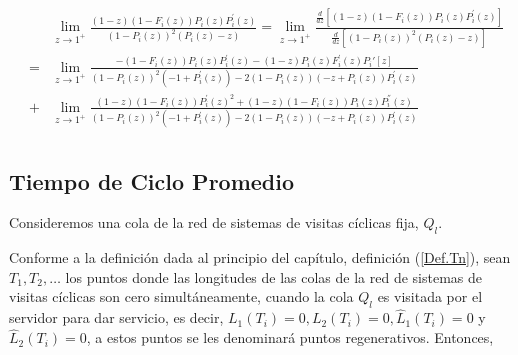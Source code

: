 \documentclass{article}
\begin{document}
\begin{eqnarray*}
&&\lim_{z\rightarrow1^{+}}\frac{\left(1-z\right)\left(1-F_{i}\left(z\right)\right)P_{i}\left(z\right)P_{i}^{'}\left(z\right)}{\left(1-P_{i}\left(z\right)\right)^{2}\left(P_{i}\left(z\right)-z\right)}=\lim_{z\rightarrow1^{+}}\frac{\frac{d}{dz}\left[\left(1-z\right)\left(1-F_{i}\left(z\right)\right)P_{i}\left(z\right)P_{i}^{'}\left(z\right)\right]}{\frac{d}{dz}\left[\left(1-P_{i}\left(z\right)\right)^{2}\left(P_{i}\left(z\right)-z\right)\right]}\\
&=&\lim_{z\rightarrow1^{+}}\frac{-\left(1-F_{i}\left(z\right)\right) P_{i}\left(z\right) P_{i}^{'}\left(z\right)-(1-z) P_{i}\left(z\right) F_{i}^{'}\left(z\right)P_i'[z]}{\left(1-P_{i}\left(z\right)\right)^2 \left(-1+P_{i}^{'}\left(z\right)\right)-2 \left(1-P_{i}\left(z\right)\right) \left(-z+P_{i}\left(z\right)\right) P_{i}^{'}\left(z\right)}\\
&+&\lim_{z\rightarrow1^{+}}\frac{(1-z) \left(1-F_{i}\left(z\right)\right) P_{i}^{'}\left(z\right)^2+(1-z) \left(1-F_{i}\left(z\right)\right) P_{i}\left(z\right) P_{i}^{''}\left(z\right)}{\left(1-P_{i}\left(z\right)\right)^2 \left(-1+P_{i}^{'}\left(z\right)\right)-2 \left(1-P_{i}\left(z\right)\right) \left(-z+P_{i}\left(z\right)\right) P_{i}^{'}\left(z\right)}\\
\end{eqnarray*}




\subsection{Tiempo de Ciclo Promedio}

Consideremos una cola de la red de sistemas de visitas c\'iclicas fija, $Q_{l}$.


Conforme a la definici\'on dada al principio del cap\'itulo, definici\'on (\ref{Def.Tn}), sean $T_{1},T_{2},\ldots$ los puntos donde las longitudes de las colas de la red de sistemas de visitas c\'iclicas son cero simult\'aneamente, cuando la cola $Q_{l}$ es visitada por el servidor para dar servicio, es decir, $L_{1}\left(T_{i}\right)=0,L_{2}\left(T_{i}\right)=0,\hat{L}_{1}\left(T_{i}\right)=0$ y $\hat{L}_{2}\left(T_{i}\right)=0$, a estos puntos se les denominar\'a puntos regenerativos. Entonces, 
\end{document}
